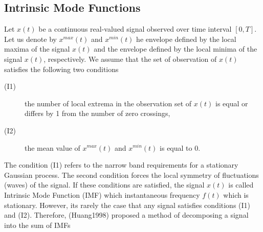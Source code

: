 \documentclass[article,moreauthors,pdftex,10pt,a4paper]{ssrn}
\begin{document}
\subsection{Intrinsic Mode Functions}
Let $x(t)$ be a continuous real-valued signal observed over time interval $[0,T]$. Let us denote by  $x^{max}(t) $ and $x^{min}(t)$ 	
he envelope defined by the local maxima of the signal $x(t)$ and the envelope  defined by the local minima of the signal $x(t)$, respectively.  We assume that the set of observation of $x(t)$ satisfies the following two conditions
\begin{description}
\item[(I1)] the number of local extrema in the observation set of $x(t)$ is equal or differs by 1 from the number of zero crossings,
\item[(I2)] the mean  value of  $x^{max}(t) $ and $x^{min}(t)$ is equal to 0.
\end{description}
The condition (I1) refers to the narrow band requirements for a stationary Gaussian process. The second condition forces the local symmetry of fluctuations (waves) of the signal. If these conditions are satisfied, the signal $x(t)$ is called Intrinsic Mode Function (IMF) which instantaneous frequency $f(t)$ which is stationary. However, its rarely the case that any signal satisfies conditions (I1) and (I2). Therefore,  (Huang1998) proposed a method of decomposing a signal into the sum of IMFs
\end{document}
